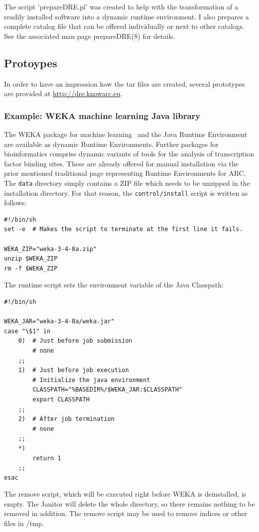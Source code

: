 The script 'prepareDRE.pl' was created to help with the transformation
of a readily installed software into a dynamic runtime environment.
I also prepares a complete catalog file that can be offered
individually or next to other catalogs. See the associated man page
prepareDRE(8) for details.

\subsection{Protoypes}

In order to have an impression how the tar files are created, several
prototypes are provided at \url{http://dre.knowarc.eu}.

\subsubsection{Example: WEKA machine learning Java library}

The WEKA package for machine learning~\cite{FRANK_2004} and the Java
Runtime Environment are available as dynamic Runtime Environments. Further
packages for bioinformatics comprise dynamic variants of tools for
the analysis of transcription factor binding sites. These are already
offered for manual installation via the prior mentioned traditional page
representing Runtime Environments for ARC.
The \texttt{data} directory simply contains
a ZIP file which needs to be unzipped in the installation directory. For
that reason, the \texttt{control/install} script is written as follows:

\begin{verbatim} 
#!/bin/sh
set -e  # Makes the script to terminate at the first line it fails.

WEKA_ZIP="weka-3-4-8a.zip"
unzip $WEKA_ZIP
rm -f $WEKA_ZIP
\end{verbatim}
The runtime script sets the environment variable of the Java Classpath:
\begin{verbatim}
#!/bin/sh

WEKA_JAR="weka-3-4-8a/weka.jar"
case "\$1" in
	0)	# Just before job submission
		# none
	;;
	1)	# Just before job execution
		# Initialize the java environment
		CLASSPATH="%BASEDIR%/$WEKA_JAR:$CLASSPATH"
		export CLASSPATH
	;;
	2)	# After job termination
		# none
	;;
	*)
		return 1
	;;
esac	
\end{verbatim}

The remove script, which will be executed right before WEKA is
deinstalled, is empty. The Janitor will delete the whole directory,
so there remains nothing to be removed in addition.
The remove script may \eg be used to remove indices or other files
in /tmp.

